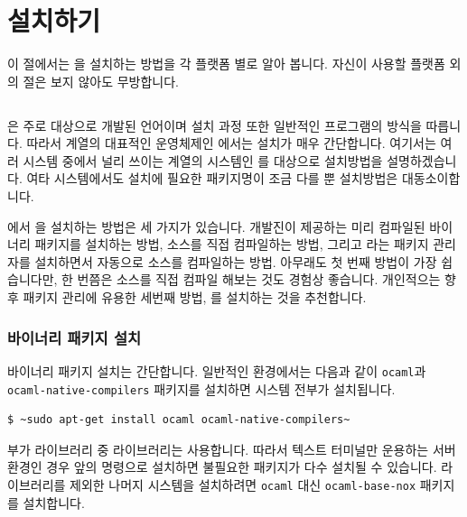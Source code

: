 \section{설치하기}\label{sec:install}

이 절에서는 \OCAML{}을 설치하는 방법을 각 플랫폼 별로 알아 봅니다. 자신이
사용할 플랫폼 외의 절은 보지 않아도 무방합니다.

\subsection{\LINUX{}}

\OCAML{}은 주로 \UNIX{} 대상으로 개발된 언어이며 설치 과정 또한 일반적인
\UNIX{} 프로그램의 방식을 따릅니다. 따라서 \UNIX{} 계열의 대표적인 운영체제인
\LINUX{}에서는 \OCAML{} 설치가 매우 간단합니다. 여기서는 여러
\LINUX{} 시스템 중에서 널리 쓰이는 \DEBIAN{} 계열의 시스템인 \UBUNTU{}를
대상으로 설치방법을 설명하겠습니다. 여타 \LINUX{} 시스템에서도 설치에 필요한
패키지명이 조금 다를 뿐 설치방법은 대동소이합니다.

\LINUX{}에서 \OCAML{}을 설치하는 방법은 세 가지가 있습니다. \LINUX{}
개발진이 제공하는 미리 컴파일된 바이너리 패키지를 설치하는 방법, \OCAML{}
소스를 직접 컴파일하는 방법, 그리고 \GODI{}라는 \OCAML{} 패키지 관리자를
설치하면서 자동으로 소스를 컴파일하는 방법. 아무래도 첫 번째 방법이 가장
쉽습니다만, 한 번쯤은 소스를 직접 컴파일 해보는 것도 경험상
좋습니다. 개인적으는 향후 패키지 관리에 유용한 세번째 방법, \GODI{}를 설치하는
것을 추천합니다.

\subsubsection{바이너리 패키지 설치}

바이너리 패키지 설치는 간단합니다. 일반적인 환경에서는 다음과 같이
\texttt{ocaml}과 \texttt{ocaml-native-compilers} 패키지를 설치하면 \OCAML{}
시스템 전부가 설치됩니다.

\begin{lstlisting}
$ ~sudo apt-get install ocaml ocaml-native-compilers~
\end{lstlisting}

\OCAML{} 부가 라이브러리 중 \GRAPHICS{} 라이브러리는 \XWIN{}\를
사용합니다. 따라서 텍스트 터미널만 운용하는 서버 환경인 경우 앞의 명령으로
\OCAML{}\을 설치하면 불필요한 패키지가 다수 설치될 수
있습니다. \GRAPHICS{} 라이브러리를 제외한 나머지 \OCAML{} 시스템을
설치하려면 \texttt{ocaml} 대신 \texttt{ocaml-base-nox} 패키지를 설치합니다.

